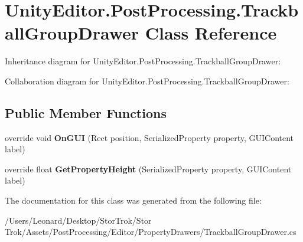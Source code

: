 \hypertarget{class_unity_editor_1_1_post_processing_1_1_trackball_group_drawer}{}\section{Unity\+Editor.\+Post\+Processing.\+Trackball\+Group\+Drawer Class Reference}
\label{class_unity_editor_1_1_post_processing_1_1_trackball_group_drawer}


Inheritance diagram for Unity\+Editor.\+Post\+Processing.\+Trackball\+Group\+Drawer\+:


Collaboration diagram for Unity\+Editor.\+Post\+Processing.\+Trackball\+Group\+Drawer\+:
\subsection*{Public Member Functions}
\begin{DoxyCompactItemize}
\item 
\mbox{\label{class_unity_editor_1_1_post_processing_1_1_trackball_group_drawer_a8d90fa1568d3c85d649dfcc4814e7433}} 
override void {\bfseries On\+G\+UI} (Rect position, Serialized\+Property property, G\+U\+I\+Content label)
\item 
\mbox{\label{class_unity_editor_1_1_post_processing_1_1_trackball_group_drawer_ad37342e5aad4e98329b8d41666db6d9a}} 
override float {\bfseries Get\+Property\+Height} (Serialized\+Property property, G\+U\+I\+Content label)
\end{DoxyCompactItemize}


The documentation for this class was generated from the following file\+:\begin{DoxyCompactItemize}
\item 
/\+Users/\+Leonard/\+Desktop/\+Stor\+Trok/\+Stor Trok/\+Assets/\+Post\+Processing/\+Editor/\+Property\+Drawers/Trackball\+Group\+Drawer.\+cs\end{DoxyCompactItemize}
